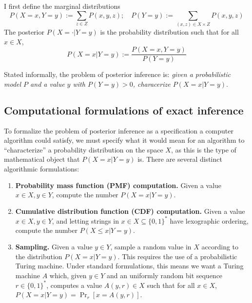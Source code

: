 \documentclass{article}
\theoremstyle{definition}
\theoremstyle{remark}
\begin{document}
I first define the marginal distributions
$$
P(X = x, Y = y) := \sum_{z \in Z} P(x, y, z); \quad P(Y = y) := \sum_{(x, z) \in X \times Z} P(x, y, z)
$$
The posterior $P(X = \cdot | Y = y)$ is the probability distribution such that for all $x \in X$,
$$
P(X = x | Y = y) := \frac{P(X = x, Y = y)}{P(Y = y)}
$$

Stated informally, the problem of posterior inference is:
\textit{given a probabilistic model $P$ and a value $y$ with $P(Y = y) > 0$, characerize $P(X = x | Y = y)$}.

\subsection{Computational formulations of exact inference}
To formalize the problem of posterior inference as a specification a computer algorithm could satisfy, we must specify what it would mean for an algorithm to ``characterize'' a probability distribution on the space $X$, as this is the type of mathematical object that $P(X = x | Y = y)$ is.
There are several distinct algorithmic formulations:
\begin{enumerate}
    \item \textbf{Probability mass function (PMF) computation.} Given a value $x \in X, y \in Y$, compute the number $P(X = x | Y = y)$.
    \item \textbf{Cumulative distribution function (CDF) computation.} Given a value $x \in X, y \in Y$, and letting strings in $x \in X \subseteq \{0, 1\}^*$ have lexographic ordering, compute the number $P(X \leq x | Y = y)$.
    \item \textbf{Sampling.} Given a value $y \in Y$, sample a random value in $X$ according to the distribution $P(X = x | Y = y)$.  This requires the use of a probabilistic Turing machine.  Under standard formulations, this means we want a Turing machine $A$ which, given $y \in Y$ and an uniformly random bit sequence $r \in \{0, 1\}^*$, computes a value $A(y, r) \in X$ such that for all $x \in X$, $P(X = x | Y = y) = \Pr_r[x = A(y, r)]$.
\end{enumerate}
\end{document}
